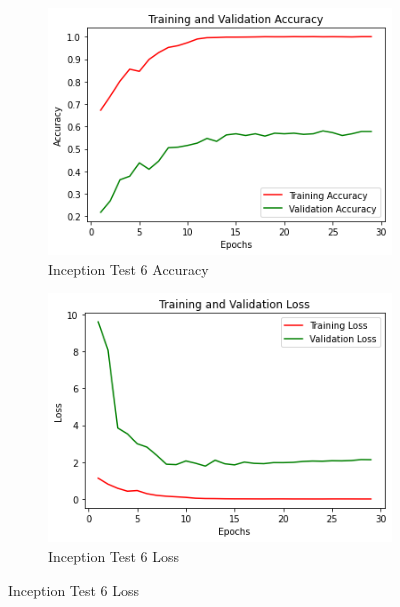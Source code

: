 \begin{figure}[H]
	\begin{subfigure}{0.5\textwidth}
		\includegraphics[width=0.9\linewidth]{img/inception/inceptionft3expacc.png} 
		\caption{Inception Test 6 Accuracy}
		\label{fig:inceptionft3expacc}
	\end{subfigure}
	\begin{subfigure}{0.5\textwidth}
		\includegraphics[width=0.9\linewidth]{img/inception/inceptionft3exploss.png}
		\caption{Inception Test 6 Loss}
		\label{fig:inceptionft3exploss}
	\end{subfigure}
\end{figure}



